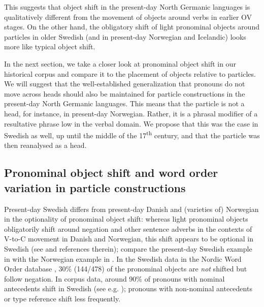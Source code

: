 \documentclass[output=paper]{langscibook}
\begin{document}
This suggests that object shift in the present-day North Germanic languages is qualitatively different from the movement of objects around verbs in earlier OV stages. On the other hand, the obligatory shift of light pronominal objects around particles in older Swedish (and in present-day Norwegian and Icelandic) looks more like typical object shift. 



In the next section, we take a closer look at pronominal object shift in our historical corpus and compare it to the placement of objects relative to particles. We will suggest that the well-established generalization that pronouns do not move across heads should also be maintained for particle constructions in the present-day North Germanic languages. This means that the particle is not a head, for instance, in present-day Norwegian. Rather, it is a phrasal modifier of a resultative phrase low in the verbal domain. We propose that this was the case in Swedish as well, up until the middle of the 17\textsuperscript{th} century, and that the particle was then reanalysed as a head. 


\subsection{Pronominal object shift and word order variation in particle constructions}\label{sec:lalu:6.2}

Present-day Swedish differs from present-day Danish and (varieties of) Norwegian in the optionality of pronominal object shift: whereas light pronominal objects obligatorily shift around negation and other sentence adverbs in the contexts of V-to-C movement in Danish and Norwegian, this shift appears to be optional in Swedish (see \citealt{Bentzen2014} and references therein); compare the present-day Swedish example in  with the Norwegian example in . In the Swedish data in the Nordic Word Order database \citep{LundquistEtAl2019}, 30\% (144/478) of the pronominal objects are \textit{not} shifted but follow negation. In corpus data, around 90\% of pronouns with nominal antecedents shift in Swedish (see e.g. \citealt{Andreasson2008}); pronouns with non-nominal antecedents or type reference shift less frequently.


\ea\label{ex:lalu:51}
\end{document}
